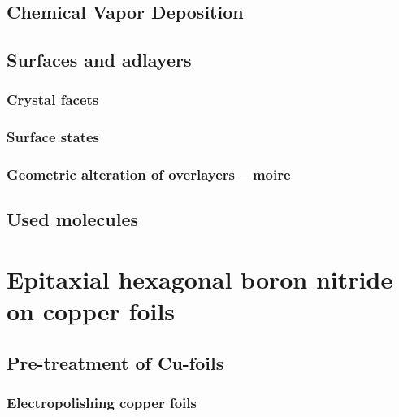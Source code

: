 \documentclass[10pt,a4paper,twoside
]{scrbook}
\begin{document}
  \section{\textbf{C}hemical \textbf{V}apor \textbf{D}eposition}
        
  \section{Surfaces and adlayers}
     \subsection{Crystal facets}
        
     \subsection{Surface states}
	
     \subsection{Geometric alteration of overlayers -- moire}
	
  \section{Used molecules}
    
\printbibliography

\chapter{Epitaxial hexagonal boron nitride on copper foils}
\section{Pre-treatment of Cu-foils}
  \subsection{Electropolishing copper foils}
  
%      
%      
\end{document}
